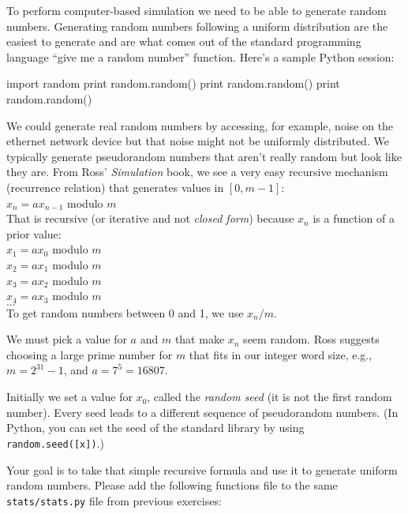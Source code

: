 \begin{fullwidth}

To perform computer-based simulation we need to be able to generate random numbers. Generating random numbers following a uniform distribution are the easiest to generate and are what comes out of the standard programming language ``give me a random number'' function.  Here's a sample Python session:

\begin{pyconsole}
import random
print random.random()
print random.random()
print random.random()
\end{pyconsole}

We could generate real random numbers by accessing, for example, noise on the ethernet network device but that noise might not be uniformly distributed. We typically generate pseudorandom numbers that aren't really random but look like they are. From Ross' {\em Simulation} book,  we see a very easy recursive mechanism (recurrence relation) that generates values in $[0,m-1]$:\\

$x_n = a x_{n-1}$ modulo $m$\\

\noindent That is recursive (or iterative and not {\em closed form}) because $x_n$ is a function of a prior value: \\

$x_1 = ax_0$ modulo $m$\\
$x_2 = ax_1$ modulo $m$\\
$x_3 = ax_2$ modulo $m$\\
$x_4 = ax_3$ modulo $m$\\
$...$\\

\noindent To get random numbers between 0 and 1, we use $x_n / m$.

We must pick a value for $a$ and $m$ that make $x_n$ seem random. Ross suggests choosing a large prime number for $m$ that fits in our integer word size, e.g., $m = 2^{31} - 1$, and $a = 7^5 = 16807$.

Initially we set a value for $x_0$, called the {\em random seed} (it is not the first random number). Every seed leads to a different sequence of pseudorandom numbers. (In Python, you can set the seed of the standard library by using {\tt random.seed([x])}.)

Your goal is to take that simple recursive formula and use it to generate uniform random numbers. Please add the following functions file to the same {\tt stats/stats.py} file from previous exercises:


\end{fullwidth}
